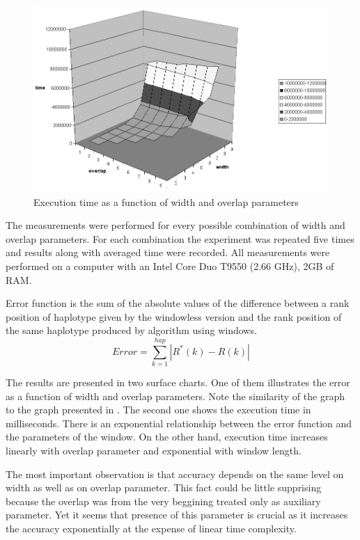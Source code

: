 \documentclass[]{spie}
\begin{document}
\begin{figure}
\centering
\includegraphics[scale=0.4]{images/czas}
\caption{Execution time as a function of width and overlap parameters}
\label{fig:time}
\end{figure}


The measurements were performed for every possible combination of width and overlap parameters.
For each combination the experiment was repeated five times and results along with averaged time were recorded.
All measurements were performed on a computer with an Intel Core Duo T9550 (2.66 GHz), 2GB of RAM.

Error function is the sum of the absolute values of the difference between a rank position of haplotype given by the windowless version and the rank position of the same haplotype produced by algorithm using windows.
$$ Error = \sum_{k=1}^{hap} |R^{*}(k) - R(k)|$$

The results are presented in two surface charts.
One of them illustrates the error as a function of width and overlap parameters.
Note the similarity of the graph to the graph presented in \cite{gusev}.
The second one shows the execution time in milliseconds.
There is an exponential relationship between the error function and the parameters of the window.
On the other hand, execution time increases linearly with overlap parameter and exponential with window length.

The most important observation is that accuracy depends on the same level on width as well as on overlap parameter.
This fact could be little supprising because the overlap was from the very beggining treated only as auxiliary parameter.
Yet it seems that presence of this parameter is crucial as it increases the accuracy exponentially at the expense of linear time complexity.
\end{document}
